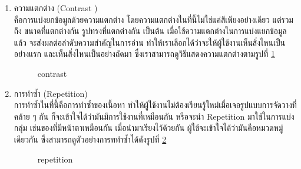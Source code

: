 \documentclass[14pt,oneside,openright,a4paper]{cpe-thai-project}
\begin{document}
  \begin{enumerate}
    \item ความแตกต่าง (Contrast ) \\
    คือการแบ่งยกข้อมูลด้วยความแตกต่าง โดยความแตกต่างในที่นี้ไม่ใช่แค่สีเพียงอย่างเดียว แต่รวมถึง ขนาดที่แตกต่างกัน รูปทรงที่แตกต่างกัน เป็นต้น เมื่อใช้ความแตกต่างในการแบ่งแยกข้อมูลแล้ว จะส่งผลต่อลำดับความสำคัญในการอ่าน ทำให้เราเลือกได้ว่าจะให้ผู้ใช้งานเห็นสิ่งไหนเป็นอย่างแรก และเห็นสิ่งไหนเป็นอย่างถัดมา ซึ่งเราสามารถดูวิธีแสดงความแตกต่างตามรูปที่ \ref{fig:contrast}
    
    \begin{figure}[!h]\centering
      \setlength{\fboxrule}{0.5mm} %
      \setlength{\fboxsep}{0.5cm}
      \caption{contrast \cite{Contrast}}\label{fig:contrast}
    \end{figure}

    \item การทำซ้ำ (Repetition)\\
    การทำซ้ำในที่นี้คือการทำซ้ำของเนื้อหา ทำให้ผู้ใช้งานไม่ต้องเรียนรู้ใหม่เมื่อเจอรูปแบบการจัดวางที่คล้าย ๆ กัน ก็จะเข้าใจได้ว่ามันมีการใช้งานที่เหมือนกัน หรือจะนำ Repetition มาใช้ในการแบ่งกลุ่ม เช่นของที่มีหน้าตาเหมือนกัน เมื่อนำมาเรียงไว้ด้วยกัน ผู้ใช้จะเข้าใจได้ว่ามันคือหมวดหมู่เดียวกัน ซึ่งสามารถดูตัวอย่างการททำซ้ำได้ดังรูปที่ \ref{fig:repietition}
    
    \begin{figure}[!h]\centering
      \setlength{\fboxrule}{0.5mm} %
      \setlength{\fboxsep}{0.5cm}
      \caption{repetition \cite{Repetition}}\label{fig:repietition}
    \end{figure}


\end{enumerate}
\end{document}
